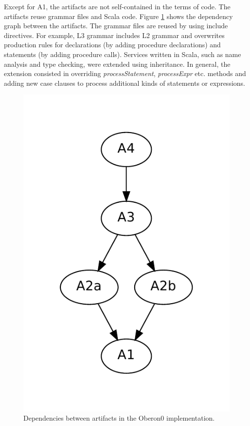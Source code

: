 Except for A1, the artifacts are not self-contained in the terms of
code. The artifacts reuse grammar files and Scala code. Figure \ref{fig:artifact-dependencies}
shows the dependency graph between the artifacts. The grammar files
are reused by using include directives. For example, L3 grammar includes
L2 grammar and overwrites production rules for declarations (by adding
procedure declarations) and statements (by adding procedure calls).
Services written in Scala, such as name analysis and type checking,
were extended using inheritance. In general, the extension consisted
in overriding \emph{processStatement}, \emph{processExpr} etc. methods
and adding new case clauses to process additional kinds of statements
or expressions.

\begin{figure}[!h]
\noindent \begin{centering}
\includegraphics[scale=0.5]{simpl/artifacts.pdf}
\par\end{centering}

\caption{\label{fig:artifact-dependencies}Dependencies between artifacts in
the Oberon0 implementation.}
\end{figure}


